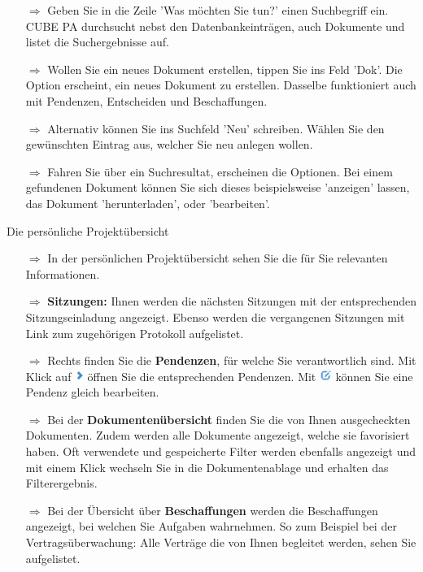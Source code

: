 \documentclass{article}
\begin{document}
\begin{multicols}{2}
\begin{tcolorbox}[colback=blue!5,colframe=blue!40!black,title=Was möchten Sie tun?]
\begin{itemize}
  \item[$\Longrightarrow$] Geben Sie in die Zeile 'Was möchten Sie tun?' einen Suchbegriff ein. CUBE PA durchsucht nebst den Datenbankeinträgen, auch Dokumente und listet die Suchergebnisse auf.
  \item[$\Longrightarrow$] Wollen Sie ein neues Dokument erstellen, tippen Sie ins Feld 'Dok'. Die Option erscheint, ein neues Dokument zu erstellen.  Dasselbe funktioniert auch mit Pendenzen, Entscheiden und Beschaffungen.
	\item[$\Longrightarrow$] Alternativ können Sie ins Suchfeld 'Neu' schreiben. Wählen Sie den gewünschten Eintrag aus, welcher Sie neu anlegen wollen.
	\item[$\Longrightarrow$] Fahren Sie über ein Suchresultat, erscheinen die Optionen. Bei einem gefundenen Dokument können Sie sich dieses beispielsweise 'anzeigen' lassen, das Dokument 'herunterladen', oder 'bearbeiten'. 
\end{itemize}
\end{tcolorbox}


\end{multicols}

\begin{beamerlikethm}{Die persönliche Projektübersicht}
\begin{itemize}
 \item[$\Longrightarrow$] In der persönlichen Projektübersicht sehen Sie die für Sie relevanten Informationen.
 \item[$\Longrightarrow$] \textbf{Sitzungen:} Ihnen werden die nächsten Sitzungen mit der entsprechenden Sitzungseinladung angezeigt. Ebenso werden die vergangenen Sitzungen mit Link zum zugehörigen Protokoll aufgelistet.
 \item[$\Longrightarrow$] Rechts finden Sie die \textbf{Pendenzen}, für welche Sie verantwortlich sind. Mit Klick auf \includegraphics[height=10pt]{Icons/Pfeil_rechts.jpg} öffnen Sie die entsprechenden Pendenzen. Mit \includegraphics[height=10pt]{Icons/bearbeiten.jpg} können Sie eine Pendenz gleich bearbeiten.
 \item[$\Longrightarrow$] Bei der \textbf{Dokumentenübersicht} finden Sie die von Ihnen ausgecheckten Dokumenten. Zudem werden alle Dokumente angezeigt, welche sie favorisiert haben. Oft verwendete und gespeicherte Filter werden ebenfalls angezeigt und mit einem Klick wechseln Sie in die Dokumentenablage und erhalten das Filterergebnis.
 \item[$\Longrightarrow$] Bei der Übersicht über \textbf{Beschaffungen} werden die Beschaffungen angezeigt, bei welchen Sie Aufgaben wahrnehmen. So zum Beispiel bei der Vertragsüberwachung: Alle Verträge die von Ihnen begleitet werden, sehen Sie aufgelistet.
\end{itemize}
\end{beamerlikethm}
\end{document}
